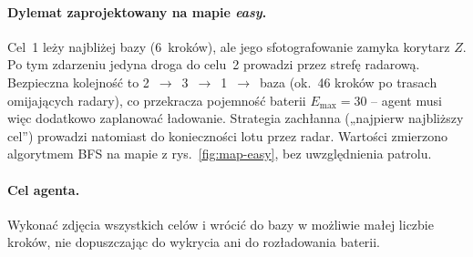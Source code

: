 \paragraph{Dylemat zaprojektowany na mapie \emph{easy}.} Cel~1 leży najbliżej
bazy (6~kroków), ale jego sfotografowanie zamyka korytarz $Z$. Po tym
zdarzeniu jedyna droga do celu~2 prowadzi przez strefę radarową. Bezpieczna
kolejność to 2~$\rightarrow$~3~$\rightarrow$~1~$\rightarrow$~baza
(ok.\ 46 kroków po trasach omijających radary), co przekracza pojemność
baterii $E_{\max}=30$ -- agent musi więc dodatkowo zaplanować ładowanie.
Strategia zachłanna („najpierw najbliższy cel'') prowadzi natomiast do
konieczności lotu przez radar. Wartości zmierzono algorytmem BFS na mapie
z rys.~\ref{fig:map-easy}, bez uwzględnienia patrolu.

\paragraph{Cel agenta.} Wykonać zdjęcia wszystkich celów i wrócić do bazy
w możliwie małej liczbie kroków, nie dopuszczając do wykrycia ani do
rozładowania baterii.
